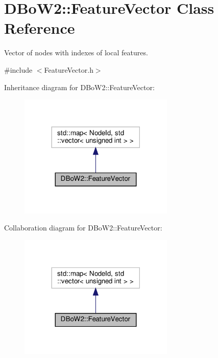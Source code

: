 \hypertarget{classDBoW2_1_1FeatureVector}{}\section{D\+Bo\+W2\+:\+:Feature\+Vector Class Reference}
\label{classDBoW2_1_1FeatureVector}


Vector of nodes with indexes of local features.  




{\ttfamily \#include $<$Feature\+Vector.\+h$>$}



Inheritance diagram for D\+Bo\+W2\+:\+:Feature\+Vector\+:\nopagebreak
\begin{figure}[H]
\begin{center}
\leavevmode
\includegraphics[width=209pt]{classDBoW2_1_1FeatureVector__inherit__graph}
\end{center}
\end{figure}


Collaboration diagram for D\+Bo\+W2\+:\+:Feature\+Vector\+:\nopagebreak
\begin{figure}[H]
\begin{center}
\leavevmode
\includegraphics[width=209pt]{classDBoW2_1_1FeatureVector__coll__graph}
\end{center}
\end{figure}
